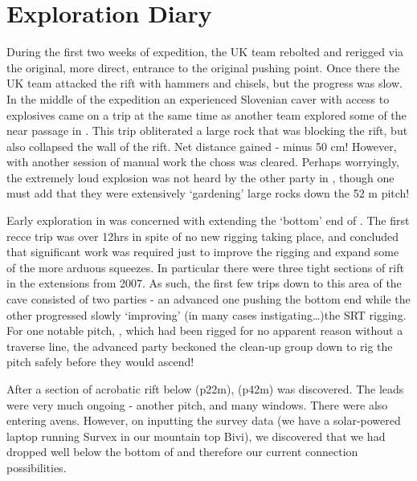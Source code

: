 \section{Exploration Diary}


During the first two weeks of expedition, the UK team rebolted and
rerigged  via the original, more direct, entrance to the
original pushing point. Once there the UK team attacked the rift with
hammers and chisels, but the progress was slow. In the middle of the
expedition an experienced Slovenian caver with access to explosives came
on a trip at the same time as another team explored some of the near
passage in . This trip obliterated a large rock that was
blocking the rift, but also collapsed the wall of the rift. Net distance
gained - minus 50 cm! However, with another session of manual work the
choss was cleared. Perhaps worryingly, the extremely loud explosion was
not heard by the other party in , though one must add
that they were extensively `gardening' large rocks down the 52 m
 pitch!

Early exploration in  was concerned with extending the
`bottom' end of . The first recce trip was over
12hrs in spite of no new rigging taking place, and concluded that
significant work was required just to improve the rigging and expand
some of the more arduous squeezes. In particular there were three tight
sections of rift in the  extensions from 2007. As such,
the first few trips down to this area of the cave consisted of two
parties - an advanced one pushing the bottom end while the other
progressed slowly `improving' (in many cases instigating\ldots{})the
SRT rigging. For one notable pitch, , which had
been rigged for no apparent reason without a traverse line, the advanced
party beckoned the clean-up group down to rig the pitch safely before
they would ascend!

After a section of acrobatic rift below  (p22m),
 (p42m) was discovered. The leads were very much
ongoing - another pitch, and many windows. There were also entering
avens. However, on inputting the survey data (we have a solar-powered
laptop running Survex in our mountain top Bivi), we discovered that we
had dropped well below the bottom of  and therefore our current
connection possibilities.


